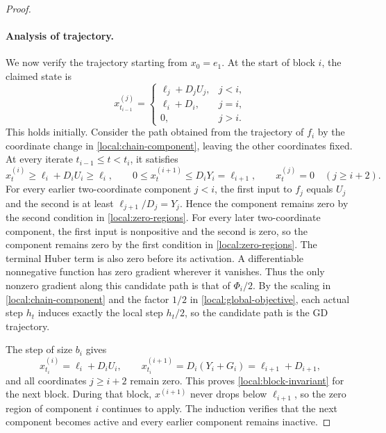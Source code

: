\documentclass[11pt,letterpaper]{article}
\theoremstyle{definition}
\begin{document}
\begin{proof}
\paragraph{Analysis of trajectory.}
We now verify the trajectory starting from $x_0=e_1$.
At the start of block $i$, the claimed state is
\begin{equation}
  x_{t_{i-1}}^{(j)}=
  \begin{cases}
    \ell_j+D_jU_j,&j<i,\\
    \ell_i+D_i,&j=i,\\
    0,&j>i.
  \end{cases}
  \label{local:block-invariant}
\end{equation}
This holds initially.
Consider the path obtained from the trajectory of $f_i$ by the coordinate change in \eqref{local:chain-component}, leaving the other coordinates fixed.
At every iterate $t_{i-1}\le t<t_i$, it satisfies
\[
  x_t^{(i)}\ge\ell_i+D_iU_i\ge\ell_i,
  \qquad 0\le x_t^{(i+1)}\le D_iY_i=\ell_{i+1},
  \qquad x_t^{(j)}=0\quad(j\ge i+2).
\]
For every earlier two-coordinate component $j<i$, the first input to $f_j$ equals $U_j$ and the second is at least $\ell_{j+1}/D_j=Y_j$.
Hence the component remains zero by the second condition in \eqref{local:zero-regions}.
For every later two-coordinate component, the first input is nonpositive and the second is zero, so the component remains zero by the first condition in \eqref{local:zero-regions}.
The terminal Huber term is also zero before its activation.
A differentiable nonnegative function has zero gradient wherever it vanishes.
Thus the only nonzero gradient along this candidate path is that of $\Phi_i/2$.
By the scaling in \eqref{local:chain-component} and the factor $1/2$ in \eqref{local:global-objective}, each actual step $h_t$ induces exactly the local step $h_t/2$, so the candidate path is the GD trajectory.

The step of size $b_i$ gives
\[
  x_{t_i}^{(i)}=\ell_i+D_iU_i,\qquad
  x_{t_i}^{(i+1)}=D_i(Y_i+G_i)=\ell_{i+1}+D_{i+1},
\]
and all coordinates $j\ge i+2$ remain zero.
This proves \eqref{local:block-invariant} for the next block.
During that block, $x^{(i+1)}$ never drops below $\ell_{i+1}$, so the zero region of component $i$ continues to apply.
The induction verifies that the next component becomes active and every earlier component remains inactive.


\end{proof}
\end{document}
